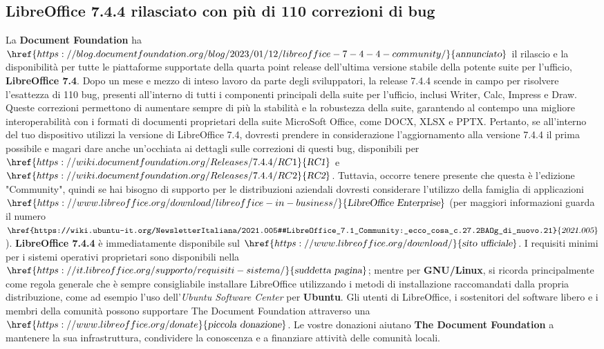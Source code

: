 \documentclass[a4paper,twoside]{article}
\begin{document}
\subsection{LibreOffice 7.4.4 rilasciato con più di 110 correzioni di bug}
La \textbf{Document Foundation} ha $\href{https://blog.documentfoundation.org/blog/2023/01/12/libreoffice-7-4-4-community/}{\textsl{annunciato}}$ il rilascio e la disponibilità per tutte le piattaforme supportate della quarta point release dell'ultima versione stabile della potente suite per l'ufficio, \textbf{LibreOffice 7.4}. Dopo un mese e mezzo di inteso lavoro da parte degli sviluppatori, la release 7.4.4 scende in campo per risolvere l'esattezza di 110 bug, presenti all'interno di tutti i componenti principali della suite per l'ufficio, inclusi Writer, Calc, Impress e Draw. Queste correzioni permettono di aumentare sempre di più la stabilità e la robustezza della suite, garantendo al contempo una migliore interoperabilità con i formati di documenti proprietari della suite MicroSoft Office, come DOCX, XLSX e PPTX. Pertanto, se all'interno del tuo dispositivo utilizzi la versione di LibreOffice 7.4, dovresti prendere in considerazione l'aggiornamento alla versione 7.4.4 il prima possibile e magari dare anche un'occhiata ai dettagli sulle correzioni di questi bug, disponibili per $\href{https://wiki.documentfoundation.org/Releases/7.4.4/RC1}{\textsl{RC1}}$ e $\href{https://wiki.documentfoundation.org/Releases/7.4.4/RC2}{\textsl{RC2}}$.
Tuttavia, occorre tenere presente che questa è l'edizione "Community", quindi se hai bisogno di supporto per le distribuzioni aziendali dovresti considerare l'utilizzo della famiglia di applicazioni $\href{https://www.libreoffice.org/download/libreoffice-in-business/}{\textsl{LibreOffice Enterprise}}$ (per maggiori informazioni guarda il numero $\href{https://wiki.ubuntu-it.org/NewsletterItaliana/2021.005#LibreOffice_7.1_Community:_ecco_cosa_c.27.2BAOg_di_nuovo.21}{\textsl{2021.005}}$). \textbf{LibreOffice 7.4.4} è immediatamente disponibile sul $\href{https://www.libreoffice.org/download/}{\textsl{sito ufficiale}}$. I requisiti minimi per i sistemi operativi proprietari sono disponibili nella $\href{https://it.libreoffice.org/supporto/requisiti-sistema/}{\textsl{suddetta pagina}}$; mentre per \textbf{GNU/Linux}, si ricorda principalmente come regola generale che è sempre consigliabile installare LibreOffice utilizzando i metodi di installazione raccomandati dalla propria distribuzione, come ad esempio l'uso dell'\textit{Ubuntu Software Center} per \textbf{Ubuntu}. Gli utenti di LibreOffice, i sostenitori del software libero e i membri della comunità possono supportare The Document Foundation attraverso una $\href{https://www.libreoffice.org/donate}{\textsl{piccola donazione}}$. Le vostre donazioni aiutano \textbf{The Document Foundation} a mantenere la sua infrastruttura, condividere la conoscenza e a finanziare attività delle comunità locali.
\end{document}
